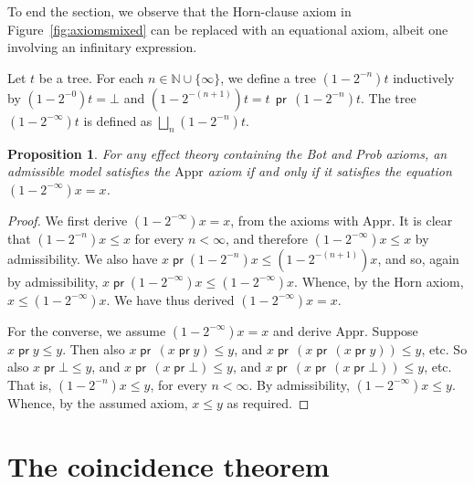 \documentclass[a4paper,UKenglish]{lipics-v2018}
\newcommand{\prEff}{\operatorname{\textsf{pr}}}
\newcommand{\Iterx}[1]{(1\!-\!2^{- #1})x}
\newcommand{\Iter}[2]{(1\!-\!2^{- #2})#1}
\theoremstyle{plain}
\newtheorem{proposition}[theorem]{Proposition}
\begin{document}
To end the section, we observe that the Horn-clause axiom in Figure~\ref{fig:axiomsmixed} can be replaced with an equational axiom, albeit one involving an infinitary expression.



\begin{definition}
    \label{def:probaApproxConstruct}
    Let $t$ be a  tree. For each $n \in \mathbb{N} \cup \{\infty\}$, we define a tree $\Iter{t}{n}$ inductively by
    $\Iter{t}{0} = \bot$ and $\Iter{t}{(n+1)}  = t\,  \prEff \,\Iter{t}{n}$. The
    tree $\Iter{t}{\infty}$ is defined as $\bigsqcup_n \Iter{t}{n}$.
\end{definition}

\begin{proposition}%
\label{proposition:horn}
    For any effect theory containing the Bot and Prob axioms, an admissible model satisfies the $\text{Appr}$
     axiom if and only if it satisfies the equation 
    $\Iterx{\infty}= x$.
\end{proposition}

\begin{proof} We first derive $\Iterx{\infty}= x$, from the axioms with $\text{Appr}$.
    It is clear that $\Iterx{n} \leq  x$ for every $n < \infty$,
    and therefore $\Iterx{\infty} \leq  x$ by admissibility.
    We also have $x \prEff \Iterx{n} \leq  \Iterx{(n+1)}$,
    and so, again by admissibility, $x \prEff \Iterx{\infty} \leq \Iterx{\infty}$.
    Whence, by the Horn axiom, $x  \leq \Iterx{\infty}$. 
     We have thus derived $\Iterx{\infty}= x$.

    For the converse, we assume $\Iterx{\infty}= x$ and derive  $\text{Appr}$.
    Suppose $x \prEff y \leq y$.  Then also  $x \prEff \, (x \prEff y) \leq y$, and $x \prEff \, ( x \prEff \, (x \prEff y)) \leq y$, etc. So also $x \prEff \bot \leq y$, and $x \prEff \, (x \prEff \bot) \leq y$, and $x \prEff \, ( x \prEff \, (x \prEff \bot)) \leq y$,
 etc. That is, $\Iterx{n} \leq y$, for every $n < \infty$. By admissibility, $\Iterx{\infty} \leq y$. Whence, by the assumed axiom, $x \leq y$ as required.
 \end{proof}


\section{The coincidence theorem}
\label{section:equivalence}
\end{document}
